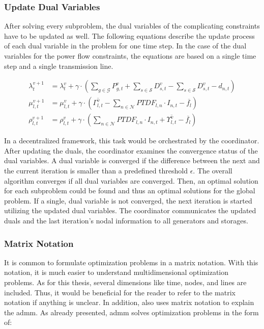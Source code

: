 \subsubsection*{Update Dual Variables}

After solving every subproblem, the dual variables of the complicating constraints have to be updated as well. The following equations describe the update process of each dual variable in the problem for one time step. In the case of the dual variables for the power flow constraints, the equations are based on a single time step and a single transmission line.

\begin{subequations}
	\begin{align}
		\lambda_t^{v+1} &= \lambda_t^{v} + \gamma \cdot (\sum_{g\in\mathcal{G}}P_{g,t}^{v} + \sum_{s\in\mathcal{S}}D_{s,t}^{v} - \sum_{s\in\mathcal{S}}D_{s,t}^{v} - d_{n,t}) \label{eq:update-duals:lambda} \\
		\mu_{l,t}^{v+1} &= \mu_{l,t}^{v} + \gamma \cdot (\overline{\Gamma_{l,t}^v} - \sum_{n \in \mathcal{N}} PTDF_{l,n} \cdot I_{n,t} - \overline{f_l}) \label{eq:update-duals:mu} \\
		\rho_{l,t}^{v+1} &= \rho_{l,t}^{v} + \gamma \cdot (\sum_{n \in \mathcal{N}} PTDF_{l,n} \cdot I_{n,t} + \overline{\Upsilon_{l,t}^v} - \overline{f_l})
	\end{align}
\end{subequations}

In a decentralized framework, this task would be orchestrated by the coordinator. After updating the duals, the coordinator examines the convergence status of the dual variables. A dual variable is converged if the difference between the next and the current iteration is smaller than a predefined threshold $\epsilon$. The overall algorithm converges if all dual variables are converged. Then, an optimal solution for each subproblem could be found and thus an optimal solutions for the global problem. If a single, dual variable is not converged, the next iteration is started utilizing the updated dual variables. The coordinator communicates the updated duals and the last iteration's nodal information to all generators and storages. 


\subsubsection{Matrix Notation}
\label{sec:app:matrix}

It is common to formulate optimization problems in a matrix notation. With this notation, it is much easier to understand multidimensional optimization problems. As for this thesis, several dimensions like time, nodes, and lines are included. Thus, it would be beneficial for the reader to refer to the matrix notation if anything is unclear. In addition, \citet{boyd2010} also uses matrix notation to explain the \gls{admm}. As already presented, \gls{admm} solves optimization problems in the form of:

